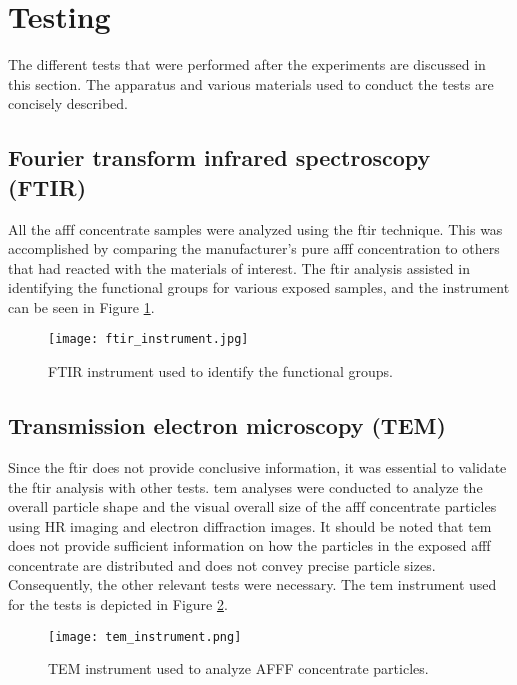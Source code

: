 \section{Testing} 
The different tests that were performed after the experiments are discussed in this section. The apparatus and various materials used to conduct the tests are concisely described.

\subsection{Fourier transform infrared spectroscopy (FTIR)}
All the \acrshort{afff} concentrate samples were analyzed using the \acrshort{ftir} technique. This was accomplished by comparing the manufacturer's pure \acrshort{afff} concentration to others that had reacted with the materials of interest. The \acrshort{ftir} analysis assisted in identifying the functional groups for various exposed samples, and the instrument can be seen in Figure \ref{ch4:figure:ftir}.
 
\begin{figure}[H]
    \centering
    \texttt{[image: ftir\_instrument.jpg]}
    \caption{FTIR instrument used to identify the functional groups.}
    \label{ch4:figure:ftir}
\end{figure}

\subsection{Transmission electron microscopy (TEM)}
Since the \acrshort{ftir} does not provide conclusive information, it was essential to validate the \acrshort{ftir} analysis with other tests. \acrshort{tem} analyses were conducted to analyze the overall particle shape and the visual overall size of the \acrshort{afff} concentrate particles using HR imaging and electron diffraction images. It should be noted that \acrshort{tem} does not provide sufficient information on how the particles in the exposed \acrshort{afff} concentrate are distributed and does not convey precise particle sizes. Consequently, the other relevant tests were necessary. The \acrshort{tem} instrument used for the tests is depicted in Figure \ref{ch4:figure:tem}.
 
\begin{figure}[H]
    \centering
    \texttt{[image: tem\_instrument.png]}
    \caption{TEM instrument used to analyze AFFF concentrate particles.}
    \label{ch4:figure:tem}
\end{figure}

